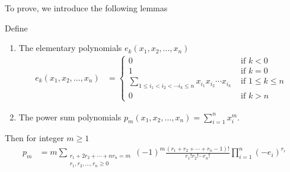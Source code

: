 \documentclass{treatise}
\begin{document}
To prove, we introduce the following lemmas
\begin{lemma} \label{newt-id-sym-poly}
Define
\begin{enumerate}
	\item The elementary polynomials $e_k (x_1, x_2, \hdots, x_n)$
	\begin{align*}
	e_k (x_1, x_2, \hdots, x_n) & = \begin{cases}
		0 & \mbox{ if } k < 0 \\
		1 & \mbox{ if } k = 0 \\
		\sum_{1 \leq i_1 < i_2 < \cdots i_k \leq n} x_{i_1} x_{i_2} \cdots x_{i_k} & \mbox{ if } 1 \leq k \leq n \\
		0 & \mbox{ if } k > n
	\end{cases}
	\end{align*}
	\item The power sum polynomials $p_m (x_1, x_2, \hdots, x_n) = \sum_{i = 1}^n x_i^m$.
\end{enumerate}
Then for integer $m \geq 1$
\begin{align*}	
p_m & = m \sum_{\substack{r_1 + 2r_2 + \cdots + n r_n = m \\ r_1, r_2, \hdots, r_n \geq 0}} (-1)^m \frac{(r_1 + r_2 + \cdots + r_n - 1)!}{r_1! r_2! \cdots r_n!} \prod_{i = 1}^n (-e_i)^{r_i}
\end{align*}
\end{lemma}
\end{document}
